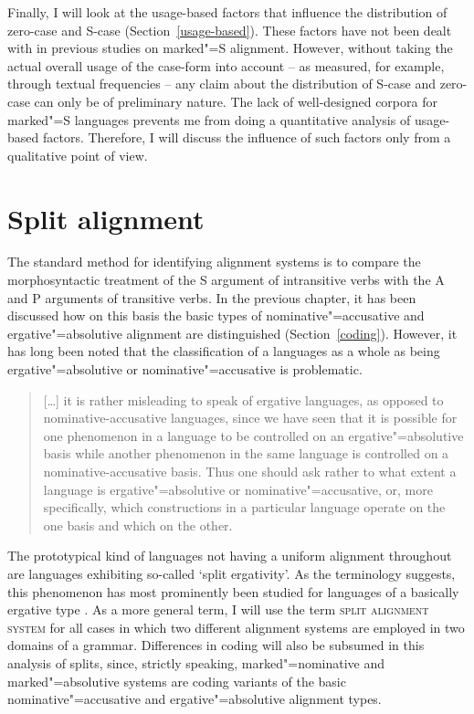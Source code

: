 Finally, I will look at the usage-based factors that influence the distribution of zero-case and S-case (Section~\ref{usage-based}). 
These factors have not been dealt with in previous studies on marked"=S alignment.  
However, without taking the actual overall usage of the case-form into account -- as measured, for example,  through textual frequencies -- any claim about the distribution of S-case and zero-case can only be of preliminary nature. 
The lack of well-designed corpora for marked"=S languages prevents me from doing a quantitative analysis of usage-based factors. 
Therefore, I will discuss the influence of such factors only from a qualitative point of view. 


\section{Split alignment}\label{grammar-based}

The standard method for identifying alignment systems is to compare the morphosyntactic treatment of the S argument of intransitive verbs with the A and P arguments of transitive verbs. 
In the previous chapter, it has been discussed how on this basis the basic types of nominative"=accusative and ergative"=absolutive alignment are distinguished (Section~\ref{coding}). However, it has long been noted that the classification of a languages as a whole as being ergative"=absolutive or nominative"=accusative is problematic.   

\begin{quote}
[\ldots] it is rather misleading to speak of ergative languages, as opposed to no\-mi\-na\-tive-ac\-cu\-sa\-tive languages, since we have seen that it is possible for one phenomenon in a language to be controlled on an ergative"=absolutive basis while another phenomenon in the same language is controlled on a no\-mi\-na\-tive-accusative basis. Thus one should ask rather to what extent a language is ergative"=absolutive or nominative"=accusative, or, more specifically, which constructions in a particular language operate on the one basis and which on the other.
\citep[350--351]{Comrie:1978}
\end{quote}

The prototypical kind of languages not having a uniform alignment throughout are languages exhibiting so-called `split ergativity'. 
As the terminology suggests, this phenomenon has most prominently been studied for languages of a basically ergative type \citep[cf.][]{Silverstein:1976, Dixon:1994}. 
As a more general term, I will use the term \textsc{split alignment system} for all cases in which two different alignment systems are employed in two domains of a grammar. 
Differences in coding will also be subsumed in this analysis of splits, since, strictly speaking, marked"=nominative and marked"=absolutive systems are coding variants of the basic nominative"=accusative and ergative"=absolutive alignment types.

